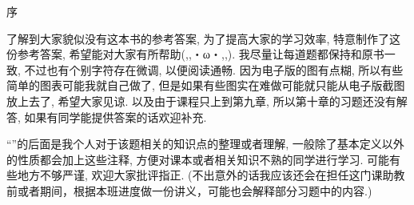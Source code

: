 \clearpage
\hideheaderfooter

\vspace*{-5mm} 
\begin{center}
    \large \heiti 序
\end{center}

了解到大家貌似没有这本书的参考答案, 为了提高大家的学习效率, 特意制作了这份参考答案, 希望能对大家有所帮助(,,・ω・,,). 我尽量让每道题都保持和原书一致, 不过也有个别字符存在微调, 以便阅读通畅. 因为电子版的图有点糊, 所以有些简单的图表可能我就自己做了, 但是如果有些图实在难做可能就只能从电子版截图放上去了, 希望大家见谅. 以及由于课程只上到第九章, 所以第十章的习题还没有解答, 如果有同学能提供答案的话欢迎补充.

\hspace*{2em} 

\hspace*{2em} \kaishu ``{\textcolor{themeColor}{\selectfont {}}}''的后面是我个人对于该题相关的知识点的整理或者理解, 一般除了基本定义以外的性质都会加上这些注释, 方便对课本或者相关知识不熟的同学进行学习. 可能有些地方不够严谨, 欢迎大家批评指正. (不出意外的话我应该还会在担任这门课助教前或者期间，根据本班进度做一份讲义，可能也会解释部分习题中的内容.)

\hspace*{2em} 
\clearpage
